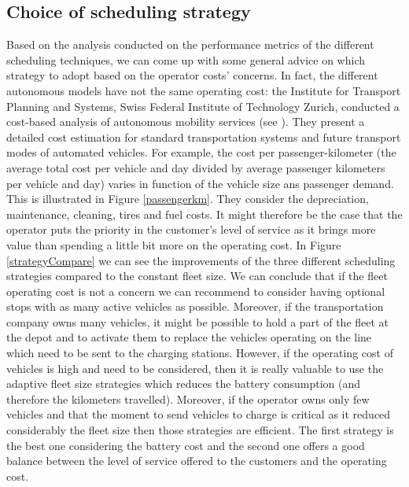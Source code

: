 \documentclass[12pt,a4paper]{article}
\begin{document}
\subsection{Choice of scheduling strategy}\label{comparestrat}
Based on the analysis conducted on the performance metrics of the different scheduling techniques, we can come up with some general advice on which strategy to adopt based on the operator costs' concerns. In fact, the different autonomous models have not the same operating cost: the Institute for Transport Planning and Systems, Swiss Federal Institute of Technology Zurich, conducted a cost-based analysis of autonomous mobility services (see \cite{ethz}). They present a detailed cost estimation for standard transportation systems and future transport modes of automated vehicles. For example, the cost per passenger-kilometer (the average total cost per vehicle and day divided by average passenger kilometers per vehicle and day) varies in function of the vehicle size ans passenger demand. This is illustrated in Figure \ref{passengerkm}. They consider the depreciation, maintenance, cleaning, tires and fuel costs. It might therefore be the case that the operator puts the priority in the customer's level of service as it brings more value than spending a little bit more on the operating cost. In Figure \ref{strategyCompare} we can see the improvements of the three different scheduling strategies compared to the constant fleet size. We can conclude that if the fleet operating cost is not a concern we can recommend to consider having optional stops with as many active vehicles as possible. Moreover, if the transportation company owns many vehicles, it might be possible to hold a part of the fleet at the depot and to activate them to replace the vehicles operating on the line which need to be sent to the charging stations. However, if the operating cost of vehicles is high and need to be considered, then it is really valuable to use the adaptive fleet size strategies which reduces the battery consumption (and therefore the kilometers travelled). Moreover, if the operator owns only few vehicles and that the moment to send vehicles to charge is critical as it reduced considerably the fleet size then those strategies are efficient. The first strategy is the best one considering the battery cost and the second one offers a good balance between the level of service offered to the customers and the operating cost.
 
\end{document}
